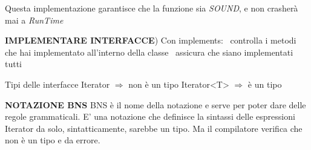 \noindent Questa implementazione garantisce che la funzione sia \textit{SOUND}, e non crasherà mai a \textit{RunTime}

\noindent \textbf{IMPLEMENTARE INTERFACCE}) Con implements: \newline
\textbullet\ controlla i metodi che hai implementato all'interno della classe \newline
\textbullet\ assicura che siano implementati tutti 

\noindent Tipi delle interfacce \newline
Iterator $\Rightarrow$ non è un tipo \newline
Iterator<T> $\Rightarrow$ è un tipo 

\noindent \textbf{NOTAZIONE BNS} \newline
BNS è il nome della notazione e serve per poter dare delle regole grammaticali. E' una notazione che definisce la sintassi delle espressioni\newline
Iterator da solo, sintatticamente, sarebbe un tipo. Ma il compilatore verifica che non è un tipo e da errore.








\newpage 

